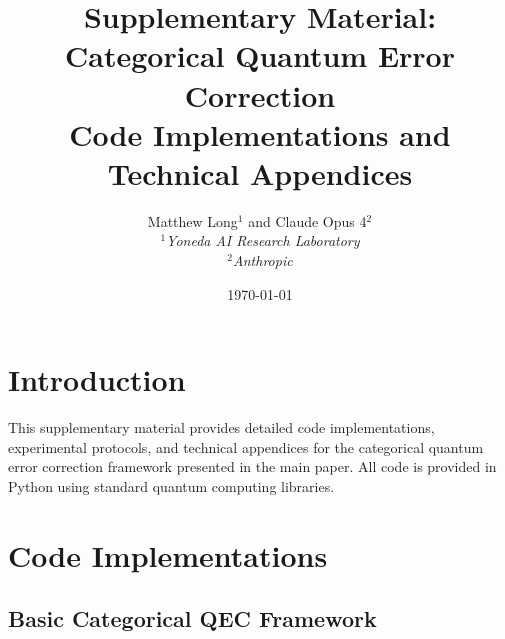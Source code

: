 \documentclass[12pt,a4paper]{article}
\title{\Large \textbf{Supplementary Material:\\Categorical Quantum Error Correction\\Code Implementations and Technical Appendices}}
\author{
Matthew Long$^{1}$ \quad and \quad Claude Opus 4$^{2}$\\[2ex]
\textit{$^{1}$Yoneda AI Research Laboratory}\\
\textit{$^{2}$Anthropic}
}
\date{\today}
\begin{document}
\maketitle

\tableofcontents

\section{Introduction}

This supplementary material provides detailed code implementations, experimental protocols, and technical appendices for the categorical quantum error correction framework presented in the main paper. All code is provided in Python using standard quantum computing libraries.

\section{Code Implementations}

\subsection{Basic Categorical QEC Framework}
\end{document}
